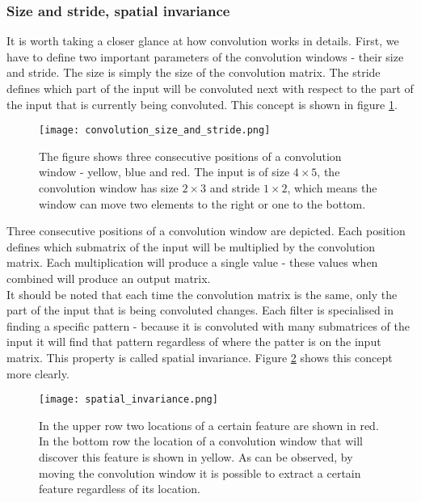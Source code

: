 \documentclass[a4paper,10pt]{report}
\begin{document}
	  \subsubsection{Size and stride, spatial invariance}
	  
	  It is worth taking a closer glance at how convolution works in details. First, we have to define two important parameters of the convolution windows - their size and stride. The size is simply the size of the convolution matrix. The stride defines which part of the input will be convoluted next with respect to the part of the input that is currently being convoluted. This concept is shown in figure \ref{fig:convolution_size_and_stride}.\\
	  
	  
	  \begin{figure}[h!]
	    \centering
	    \texttt{[image: convolution\_size\_and\_stride.png]}
	    \caption{The figure shows three consecutive positions of a convolution window - yellow, blue and red. The input is of size $4\times5$, the convolution window has size $2\times3$ and stride $1\times2$, which means the window can move two elements to the right or one to the bottom.}
	    \label{fig:convolution_size_and_stride}
	  \end{figure} 
	  
	  Three consecutive positions of a convolution window are depicted. Each position defines which submatrix of the input will be multiplied by the convolution matrix. Each multiplication will produce a single value - these values when combined will produce an output matrix.\\
	  
	  It should be noted that each time the convolution matrix is the same, only the part of the input that is being convoluted changes. Each filter is specialised in finding a specific pattern - because it is convoluted with many submatrices of the input it will find that pattern regardless of where the patter is on the input matrix. This property is called spatial invariance. Figure \ref{fig:spatial_invariance} shows this concept more clearly.\\
	  	  
	  \begin{figure}[h!]
	    \centering
	    \texttt{[image: spatial\_invariance.png]}
	    \caption{In the upper row two locations of a certain feature are shown in red. In the bottom row the location of a convolution window that will discover this feature is shown in yellow. As can be observed, by moving the convolution window it is possible to extract a certain feature regardless of its location.}
	    \label{fig:spatial_invariance}
	  \end{figure} 
	  
\end{document}
